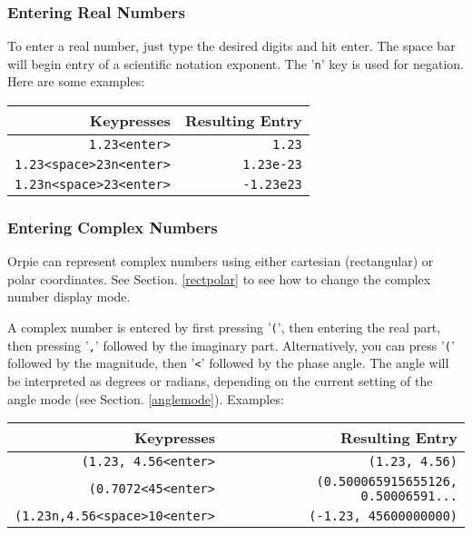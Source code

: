 \documentclass[11pt,notitlepage]{article}
\begin{document}
\subsubsection{Entering Real Numbers}
To enter a real number, just type the desired digits and hit enter.  The space
bar will begin entry of a scientific notation exponent.  The '{\tt n}' key is used
for negation.  Here are some examples:
\begin{center}
   \begin{tabular}[t]{|r|r|}
      \hline Keypresses & Resulting Entry \\
      \hline
      {\tt 1.23<enter>} & {\tt 1.23} \\
      {\tt 1.23<space>23n<enter>} & {\tt 1.23e-23} \\
      {\tt 1.23n<space>23<enter>} & {\tt -1.23e23} \\
      \hline
   \end{tabular}
\end{center}

\subsubsection{Entering Complex Numbers}
Orpie can represent complex numbers using either cartesian (rectangular) or
polar coordinates.  See Section. \ref{rectpolar} to see how to change the
complex number display mode.

A complex number is entered by first pressing '{\tt (}', then entering the real
part, then pressing '{\tt ,}' followed by the imaginary part.  Alternatively, you
can press '{\tt (}' followed by the magnitude, then '{\tt <}' followed by the
phase angle.  The angle will be interpreted as degrees or radians, depending on
the current setting of the angle mode (see Section. \ref{anglemode}).  Examples:
\begin{center}
   \begin{tabular}[t]{|r|r|}
      \hline Keypresses & Resulting Entry \\
      \hline
      {\tt (1.23, 4.56<enter>} & {\tt (1.23, 4.56)} \\
      {\tt (0.7072<45<enter>} & {\tt (0.500065915655126, 0.50006591...} \\
      {\tt (1.23n,4.56<space>10<enter>} & {\tt (-1.23, 45600000000)} \\
      \hline
   \end{tabular}
\end{center}
\end{document}

